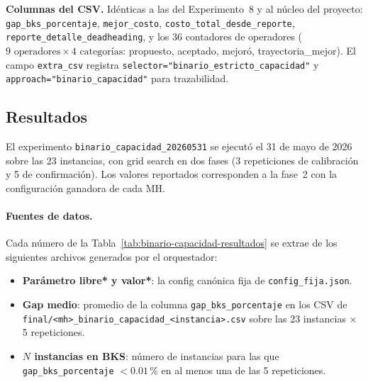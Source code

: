 \medskip
\noindent\textbf{Columnas del CSV.} Idénticas a las del Experimento~8
y al núcleo del proyecto: \texttt{gap\_bks\_porcentaje},
\texttt{mejor\_costo}, \texttt{costo\_total\_desde\_reporte},
\texttt{reporte\_detalle\_deadheading}, y los 36 contadores de
operadores ($9\text{ operadores} \times 4\text{ categorías}$:
propuesto, aceptado, mejoró, trayectoria\_mejor). El campo
\texttt{extra\_csv} registra
\texttt{selector="binario\_estricto\_capacidad"} y
\texttt{approach="binario\_capacidad"} para trazabilidad.

\subsection{Resultados}

\begin{observacion}
El experimento \texttt{binario\_capacidad\_20260531} se ejecutó el
31 de mayo de 2026 sobre las 23 instancias, con grid search en dos
fases (3 repeticiones de calibración y 5 de confirmación). Los valores
reportados corresponden a la fase~2 con la configuración ganadora de
cada MH.
\end{observacion}

\paragraph{Fuentes de datos.}
Cada número de la Tabla~\ref{tab:binario-capacidad-resultados} se
extrae de los siguientes archivos generados por el orquestador:

\begin{itemize}
\item \textbf{Parámetro libre* y valor*}: la config canónica fija de
  \texttt{config\_fija.json}.
\item \textbf{Gap medio}: promedio de la columna
  \texttt{gap\_bks\_porcentaje} en los CSV de
  \texttt{final/<mh>\_binario\_capacidad\_<instancia>.csv} sobre las
  23 instancias $\times$ 5 repeticiones.
\item \textbf{$N$ instancias en BKS}: número de instancias para las
  que \texttt{gap\_bks\_porcentaje} $< 0.01$\,\% en al menos una de
  las 5 repeticiones.
\end{itemize}

